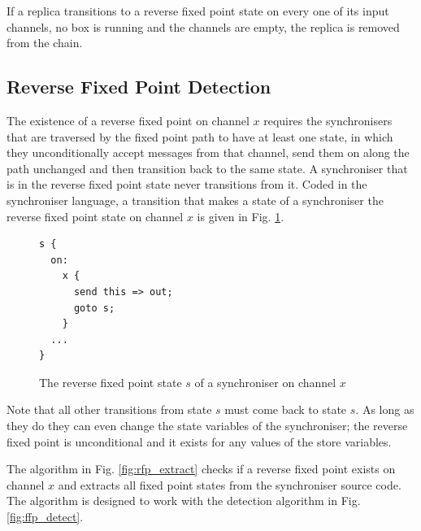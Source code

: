 If a replica transitions to a reverse fixed point state on every one of its input channels, no box is running and the channels are empty, the replica is removed from the chain.



    \subsection{Reverse Fixed Point Detection\label{rfp_detect}}
The existence of a reverse fixed point on channel $x$ requires the synchronisers that are traversed by the fixed point path to have at least one state, in which they unconditionally accept messages from that channel, send them on along the path unchanged and then transition back to the same state. A synchroniser that is in the reverse fixed point state never transitions from it. Coded in the synchroniser language, a transition that makes a state of a synchroniser the reverse fixed point state on channel $x$ is given in Fig. \ref{fig:rfp_trans}.
\begin{figure}[h!]
\begin{lstlisting}[frame=single,mathescape]
s {
  on:
    x {
      send this => out;
      goto s;
    }
  ...
}
\end{lstlisting}
\caption{The reverse fixed point state $s$ of a synchroniser on channel $x$}
\label{fig:rfp_trans}
\end{figure}

Note that all other transitions from state $s$ must come back to state $s$. As long as they do they can even change the state variables of the synchroniser; the reverse fixed point is unconditional and it exists for any values of the store variables.

The algorithm in Fig. \ref{fig:rfp_extract} checks if a reverse fixed point exists on channel $x$ and extracts all fixed point states from the synchroniser source code. The algorithm is designed to work with the detection algorithm in Fig. \ref{fig:ffp_detect}.

